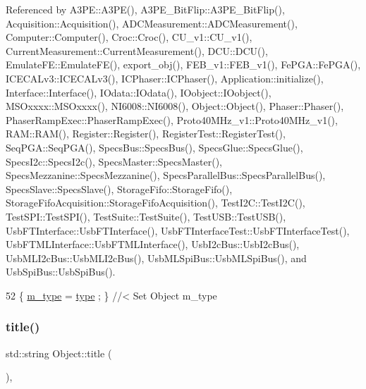 Referenced by A3\+P\+E\+::\+A3\+P\+E(), A3\+P\+E\+\_\+\+Bit\+Flip\+::\+A3\+P\+E\+\_\+\+Bit\+Flip(), Acquisition\+::\+Acquisition(), A\+D\+C\+Measurement\+::\+A\+D\+C\+Measurement(), Computer\+::\+Computer(), Croc\+::\+Croc(), C\+U\+\_\+v1\+::\+C\+U\+\_\+v1(), Current\+Measurement\+::\+Current\+Measurement(), D\+C\+U\+::\+D\+C\+U(), Emulate\+F\+E\+::\+Emulate\+F\+E(), export\+\_\+obj(), F\+E\+B\+\_\+v1\+::\+F\+E\+B\+\_\+v1(), Fe\+P\+G\+A\+::\+Fe\+P\+G\+A(), I\+C\+E\+C\+A\+Lv3\+::\+I\+C\+E\+C\+A\+Lv3(), I\+C\+Phaser\+::\+I\+C\+Phaser(), Application\+::initialize(), Interface\+::\+Interface(), I\+Odata\+::\+I\+Odata(), I\+Oobject\+::\+I\+Oobject(), M\+S\+Oxxxx\+::\+M\+S\+Oxxxx(), N\+I6008\+::\+N\+I6008(), Object\+::\+Object(), Phaser\+::\+Phaser(), Phaser\+Ramp\+Exec\+::\+Phaser\+Ramp\+Exec(), Proto40\+M\+Hz\+\_\+v1\+::\+Proto40\+M\+Hz\+\_\+v1(), R\+A\+M\+::\+R\+A\+M(), Register\+::\+Register(), Register\+Test\+::\+Register\+Test(), Seq\+P\+G\+A\+::\+Seq\+P\+G\+A(), Specs\+Bus\+::\+Specs\+Bus(), Specs\+Glue\+::\+Specs\+Glue(), Specs\+I2c\+::\+Specs\+I2c(), Specs\+Master\+::\+Specs\+Master(), Specs\+Mezzanine\+::\+Specs\+Mezzanine(), Specs\+Parallel\+Bus\+::\+Specs\+Parallel\+Bus(), Specs\+Slave\+::\+Specs\+Slave(), Storage\+Fifo\+::\+Storage\+Fifo(), Storage\+Fifo\+Acquisition\+::\+Storage\+Fifo\+Acquisition(), Test\+I2\+C\+::\+Test\+I2\+C(), Test\+S\+P\+I\+::\+Test\+S\+P\+I(), Test\+Suite\+::\+Test\+Suite(), Test\+U\+S\+B\+::\+Test\+U\+S\+B(), Usb\+F\+T\+Interface\+::\+Usb\+F\+T\+Interface(), Usb\+F\+T\+Interface\+Test\+::\+Usb\+F\+T\+Interface\+Test(), Usb\+F\+T\+M\+L\+Interface\+::\+Usb\+F\+T\+M\+L\+Interface(), Usb\+I2c\+Bus\+::\+Usb\+I2c\+Bus(), Usb\+M\+L\+I2c\+Bus\+::\+Usb\+M\+L\+I2c\+Bus(), Usb\+M\+L\+Spi\+Bus\+::\+Usb\+M\+L\+Spi\+Bus(), and Usb\+Spi\+Bus\+::\+Usb\+Spi\+Bus().


\begin{DoxyCode}
52 \{ \hyperlink{classObject_a457a600fe8c00eb1034374f75110a78c}{m\_type}  = \hyperlink{classObject_a84f99f70f144a83e1582d1d0f84e4e62}{type}  ; \} \textcolor{comment}{//< Set Object m\_type}
\end{DoxyCode}
\mbox{\label{classObject_a73a0f1a41828fdd8303dd662446fb6c3}} 
\subsubsection{\texorpdfstring{title()}{title()}}
{\footnotesize\ttfamily std\+::string Object\+::title (\begin{DoxyParamCaption}{ }\end{DoxyParamCaption})\hspace{0.3cm}{\ttfamily [inline]}, {\ttfamily [inherited]}}



